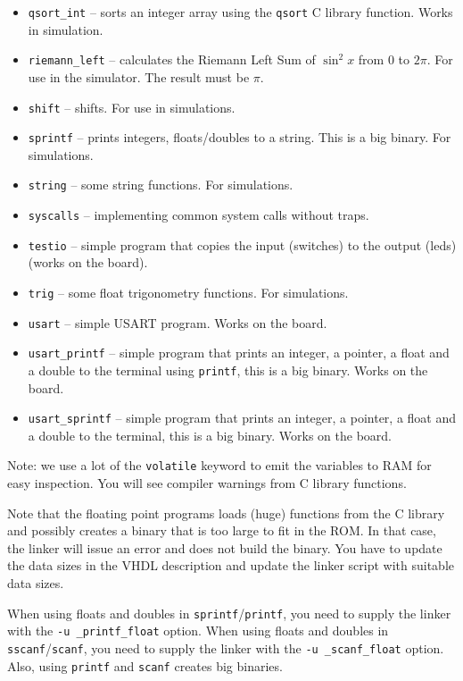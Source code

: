 \documentclass[12pt]{article}
\begin{document}
\begin{itemize}
\item \texttt{qsort\_int} -- sorts an integer array using the \texttt{qsort} C library function. Works in simulation.
\item \texttt{riemann\_left} -- calculates the Riemann Left Sum of $\sin^2 x$ from $0$ to $2\pi$. For use in the simulator. The  result must be $\pi$.
\item \texttt{shift} -- shifts. For use in simulations.
\item \texttt{sprintf} -- prints integers, floats/doubles to a string. This is a big binary. For simulations.
\item \texttt{string} -- some string functions. For simulations.
\item \texttt{syscalls} -- implementing common system calls without traps.
\item \texttt{testio} -- simple program that copies the input (switches) to the output (leds) (works on the board).
\item \texttt{trig} -- some float trigonometry functions. For simulations.
\item \texttt{usart} -- simple USART program. Works on the board.
\item \texttt{usart\_printf} -- simple program that prints an integer, a pointer, a float and a double to the terminal using \texttt{printf}, this is a big binary. Works on the board.
\item \texttt{usart\_sprintf} -- simple program that prints an integer, a pointer, a float and a double to the terminal, this is a big binary. Works on the board.
\end{itemize} 

Note: we use a lot of the \texttt{volatile} keyword to emit the variables to RAM for easy inspection. You will see compiler warnings from C library functions.

Note that the floating point programs loads (huge) functions from the C library and possibly creates a binary that is too large to fit in the ROM. In that case, the linker will issue an error and does not build the binary. You have to update the data sizes in the VHDL description and update the linker script with suitable data sizes.

When using floats and doubles in \texttt{sprintf}/\texttt{printf}, you need to supply the linker with the \lstinline|-u _printf_float| option. When using floats and doubles in \texttt{sscanf}/\texttt{scanf}, you need to supply the linker with the \lstinline|-u _scanf_float| option. Also, using \texttt{printf} and \texttt{scanf} creates big binaries.
\end{document}
